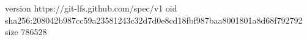 version https://git-lfs.github.com/spec/v1
oid sha256:208042b987cc59a23581243c32d7d0e8cd18fbf987baa8001801a8d68f792792
size 786528
